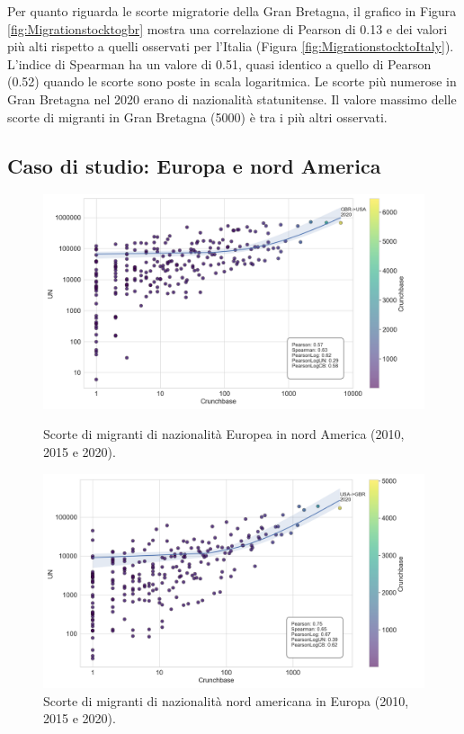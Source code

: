 Per quanto riguarda le scorte migratorie della Gran Bretagna, il grafico in Figura \ref{fig:Migrationstocktogbr} mostra una correlazione di Pearson di 0.13 e dei valori più alti rispetto a quelli osservati per l'Italia (Figura \ref{fig:MigrationstocktoItaly}). L'indice di Spearman ha un valore di 0.51, quasi identico a quello di Pearson (0.52) quando le scorte sono poste in scala logaritmica. Le scorte più numerose in Gran Bretagna nel 2020 erano di nazionalità statunitense. Il valore massimo delle scorte di migranti in Gran Bretagna (5000) è tra i più altri osservati.

\FloatBarrier
\subsection{Caso di studio: Europa e nord America}
\label{europenordamstock}
\begin{figure}[tbp]
  \centering
  \begin{minipage}[t]{1\textwidth}
    \includegraphics[width=\textwidth]{images/Migration_Stocks/NORTHAMERICA_EUROPE/Migration Stocks from Europe to North America.png}
    \caption{Scorte di migranti di nazionalità Europea in nord America (2010, 2015 e 2020).}
    \label{fig:migstockresNordAmnatEur}
  \end{minipage}
  \begin{minipage}[b]{1\textwidth}
    \includegraphics[width=\textwidth]{images/Migration_Stocks/NORTHAMERICA_EUROPE/Migration Stocks from North America to Europe.png}
    \caption{Scorte di migranti di nazionalità nord americana in Europa (2010, 2015 e 2020).}
    \label{fig:migstockresEuropenatNordAm}
  \end{minipage}
\end{figure}
